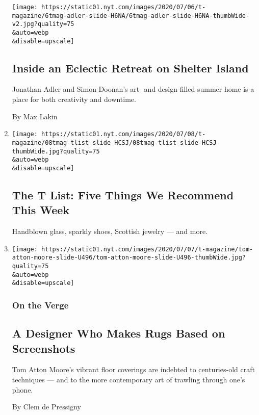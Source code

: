 \begin{enumerate}
  \texttt{[image: https://static01.nyt.com/images/2020/07/06/t-magazine/6tmag-adler-slide-H6NA/6tmag-adler-slide-H6NA-thumbWide-v2.jpg?quality=75\\\&auto=webp\\\&disable=upscale]}

  \hypertarget{inside-an-eclectic-retreat-on-shelter-island}{%
  \subsection{Inside an Eclectic Retreat on Shelter
  Island}\label{inside-an-eclectic-retreat-on-shelter-island}}

  Jonathan Adler and Simon Doonan's art- and design-filled summer home
  is a place for both creativity and downtime.

  By Max Lakin
\item
  \href{/2020/07/09/t-magazine/robert-longo-quarantine-films.html}{}

  \texttt{[image: https://static01.nyt.com/images/2020/07/08/t-magazine/08tmag-tlist-slide-HCSJ/08tmag-tlist-slide-HCSJ-thumbWide.jpg?quality=75\\\&auto=webp\\\&disable=upscale]}

  \hypertarget{the-t-list-five-things-we-recommend-this-week-2}{%
  \subsection{The T List: Five Things We Recommend This
  Week}\label{the-t-list-five-things-we-recommend-this-week-2}}

  Handblown glass, sparkly shoes, Scottish jewelry --- and more.
\item
  \href{/2020/07/07/t-magazine/tom-atton-moore.html}{}

  \texttt{[image: https://static01.nyt.com/images/2020/07/07/t-magazine/tom-atton-moore-slide-U496/tom-atton-moore-slide-U496-thumbWide.jpg?quality=75\\\&auto=webp\\\&disable=upscale]}

  \hypertarget{on-the-verge}{%
  \subsubsection{On the Verge}\label{on-the-verge}}

  \hypertarget{a-designer-who-makes-rugs-based-on-screenshots}{%
  \subsection{A Designer Who Makes Rugs Based on
  Screenshots}\label{a-designer-who-makes-rugs-based-on-screenshots}}

  Tom Atton Moore's vibrant floor coverings are indebted to
  centuries-old craft techniques --- and to the more contemporary art of
  trawling through one's phone.

  By Clem de Pressigny
\end{enumerate}

